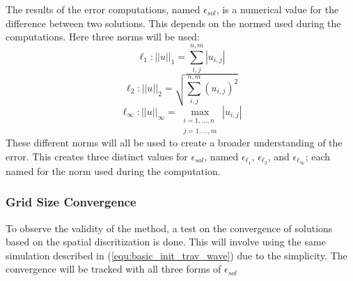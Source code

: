   The results of the error computations, named $\epsilon_{sol}$, is a numerical value for the difference between two solutions.
  This depends on the normed used during the computations.
  Here three norms will be used:
  \begin{equation}  \label{equ:norm_l1}
    \ell_1: ||u||_1 = \sum_{i,j}^{n,m} |u_{i,j}|
  \end{equation}
  \begin{equation}  \label{equ:norm_l2}
    \ell_2: ||u||_2 = \sqrt{\sum_{i,j}^{n,m} (u_{i,j})^2}
  \end{equation}
  \begin{equation}  \label{equ:norm_linf}
    \ell_\infty: ||u||_\infty = \max_{\substack{i=1,\ldots,n \\j=1,\ldots,m}} |u_{i,j}|
  \end{equation}
  These different norms will all be used to create a broader understanding of the error.
  This creates three distinct values for $\epsilon_{sol}$, named $\epsilon_{\ell_1}$, $\epsilon_{\ell_2}$, and $\epsilon_{\ell_\infty}$; each named for the norm used during the computation.
  

\subsubsection{Grid Size Convergence}
  To observe the validity of the method, a test on the convergence of solutions based on the spatial discritization is done.
  This will involve using the same simulation described in (\ref{equ:basic_init_trav_wave}) due to the simplicity. 
  The convergence will be tracked with all three forms of $\epsilon_{sol}$
  
